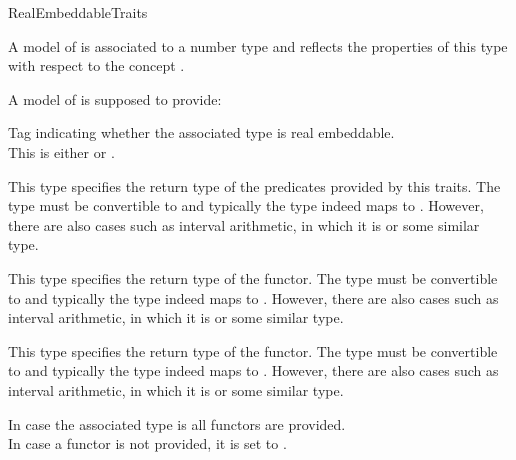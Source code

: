 \begin{ccRefConcept}{RealEmbeddableTraits}

\ccDefinition

A model of  is associated to a number type 
 and reflects the properties of this type with respect 
to the concept .

\ccTypes

A model of  is supposed to provide:\\


        { Tag indicating whether the associated type is real embeddable. \\
          This is either  or . }

        { This type specifies the return type of the predicates provided
          by this traits. The type must be convertible to  and 
          typically the type indeed maps to . However, there are also 
          cases such as interval arithmetic, in which it is  
          or some similar type. 
        }

        { This type specifies the return type of the  functor. 
          The type must be convertible to  and 
          typically the type indeed maps to . However, there are also 
          cases such as interval arithmetic, in which it is  
          or some similar type. 
        }        

        { This type specifies the return type of the  functor. 
          The type must be convertible to  and 
          typically the type indeed maps to . However, there are also 
          cases such as interval arithmetic, in which it is  
          or some similar type. 
        }     


In case the associated type is  all functors are provided.\\
In case a functor is not provided, it is set to .


\end{ccRefConcept}
